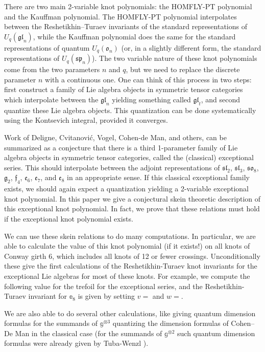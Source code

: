 \documentclass[12pt]{amsart}
\begin{document}
There are two main 2-variable knot polynomials: the HOMFLY-PT polynomial and
the Kauffman polynomial.  The HOMFLY-PT polynomial interpolates between the
Reshetikhin--Turaev invariants of the standard representations of
$U_q(\mathfrak{gl}_n)$, while the Kauffman polynomial does the same for the
standard representations of quantum $U_q(\mathfrak{o}_n)$ (or, in a slightly
different form, the standard representations of $U_q(\mathfrak{sp}_n)$).  The
two variable nature of these knot polynomials come from the two parameters $n$
and $q$, but we need to replace the discrete parameter $n$ with a continuous one.  
One can think of this process in two steps: first construct a family
of Lie algebra objects in symmetric tensor categories which interpolate
between the $\mathfrak{gl}_n$ yielding something called $\mathfrak{gl}_t$, and
second quantize these Lie algebra objects.   This quantization can be done
systematically using the Kontsevich integral, provided it converges.

Work of Deligne, Cvitanović, Vogel, Cohen-de Man, and others, can be summarized as a
conjecture that there is a third 1-parameter family of Lie algebra objects in
symmetric tensor categories, called the (classical) exceptional series.
This should interpolate between the
adjoint representations of $\mathfrak{sl}_2$, $\mathfrak{sl}_3$,
$\mathfrak{so}_8$, $\mathfrak{g}_2$, $\mathfrak{f}_4$, $\mathfrak{e}_6$,
$\mathfrak{e}_7$, and $\mathfrak{e}_8$ in an appropriate sense.  If this classical exceptional family
exists, we should again expect a quantization yielding a 2-variable
exceptional knot polynomial.  In this paper we give a conjectural skein
theoretic description of this exceptional knot polynomial. In fact, we
prove that these relations must hold if the exceptional knot polynomial
exists.

We can use these skein relations to do many computations.  In
particular, we are able to calculate the value of this knot polynomial (if it
exists!) on all knots of Conway girth 6, which includes all knots of 12 or
fewer crossings.  Unconditionally these give the first calculations of the Reshetikhin-Turaev knot invariants for the exceptional Lie algebras for most of these knots.  For example, we compute the following value for the trefoil for the exceptional series, and the Reshetikhin-Turaev invariant for $\mathbb{e}_8$ is given by setting $v=$ and $w=$.


We are also able to do several other calculations, like giving quantum dimension formulas for the summands of $\mathbb{g}^{\otimes 3}$ quantizing the dimension formulas of Cohen--De Man \cite{???} in the classical case (for the summands of $\mathbb{g}^{\otimes 2}$ such quantum dimension formulas were already given by Tuba-Wenzl \cite{???}).
\end{document}
